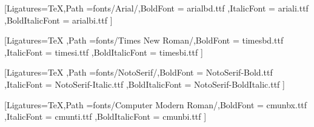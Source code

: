 \usepackage{ifthen}

\usepackage{geometry}\geometry{
    a4paper, %
    left=40mm,
    right=20mm,
    top=25mm,
    bottom=25mm,
    footskip=10mm,
    headheight=20mm %
}

\renewcommand*{\chapterheadstartvskip}{\vspace*{0mm}}

\usepackage{verbatim}

\usepackage{fontspec}

{
    \setmainfont{arial.ttf}[Ligatures=TeX,Path =fonts/Arial/,BoldFont = arialbd.ttf ,ItalicFont = ariali.ttf ,BoldItalicFont = arialbi.ttf ]
}{}

{
    \setmainfont{times.ttf}[Ligatures=TeX ,Path =fonts/Times New Roman/,BoldFont = timesbd.ttf ,ItalicFont = timesi.ttf ,BoldItalicFont = timesbi.ttf ]
}{}

{
    \setmainfont{NotoSerif-Regular.ttf}[Ligatures=TeX ,Path =fonts/NotoSerif/,BoldFont = NotoSerif-Bold.ttf ,ItalicFont = NotoSerif-Italic.ttf ,BoldItalicFont = NotoSerif-BoldItalic.ttf ]
}{}

{
    \setmainfont{cmunrm.ttf}[Ligatures=TeX,Path =fonts/Computer Modern Roman/,BoldFont = cmunbx.ttf ,ItalicFont = cmunti.ttf ,BoldItalicFont = cmunbi.ttf ]
}

\renewcommand{\baselinestretch}{1.5}

\usepackage[ngerman]{babel}
\usepackage{csquotes}

\parindent0pt



